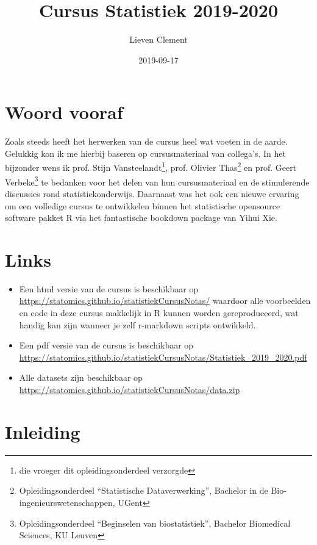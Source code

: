 \documentclass[12pt,dutch,coursenotes]{book}
\title{Cursus Statistiek 2019-2020}
\author{Lieven Clement}
\date{2019-09-17}
\providecommand{\tightlist}{%
  \setlength{\itemsep}{0pt}\setlength{\parskip}{0pt}}
\let\rmarkdownfootnote\footnote%
\def\footnote{\protect\rmarkdownfootnote}
\theoremstyle{definition}
\theoremstyle{definition}
\theoremstyle{definition}
\theoremstyle{remark}
\begin{document}
\maketitle

{
\setcounter{tocdepth}{1}
\tableofcontents
}
\chapter*{Woord vooraf}\label{woord-vooraf}

Zoals steeds heeft het herwerken van de cursus heel wat voeten in de
aarde. Gelukkig kon ik me hierbij baseren op cursusmateriaal van
collega's. In het bijzonder wens ik prof. Stijn Vansteelandt\footnote{die
  vroeger dit opleidingsonderdeel verzorgde}, prof. Olivier
Thas\footnote{Opleidingsonderdeel ``Statistische Dataverwerking'',
  Bachelor in de Bio-ingenieurswetenschappen, UGent} en prof. Geert
Verbeke\footnote{Opleidingsonderdeel ``Beginselen van biostatistiek'',
  Bachelor Biomedical Sciences, KU Leuven} te bedanken voor het delen
van hun cursusmateriaal en de stimulerende discussies rond
statistiekonderwijs. Daarnaast was het ook een nieuwe ervaring om een
volledige cursus te ontwikkelen binnen het statistische opensource
software pakket R via het fantastische bookdown package van Yihui Xie.

\chapter*{Links}\label{links}

\begin{itemize}
\tightlist
\item
  Een html versie van de cursus is beschikbaar op
  \url{https://statomics.github.io/statistiekCursusNotas/} waardoor alle
  voorbeelden en code in deze cursus makkelijk in R kunnen worden
  gereproduceerd, wat handig kan zijn wanneer je zelf r-markdown scripts
  ontwikkeld.
\item
  Een pdf versie van de cursus is beschikbaar op
  \url{https://statomics.github.io/statistiekCursusNotas/Statistiek_2019_2020.pdf}
\item
  Alle datasets zijn beschikbaar op
  \url{https://statomics.github.io/statistiekCursusNotas/data.zip}
\end{itemize}

\chapter{Inleiding}\label{inleiding}
\end{document}
